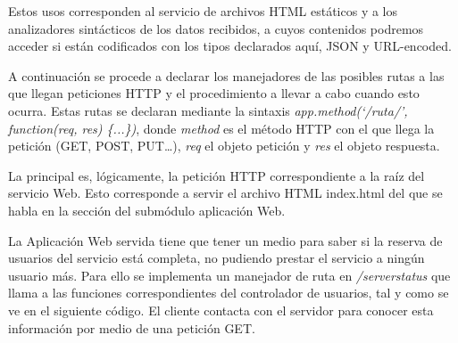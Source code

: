 
Estos usos corresponden al servicio de archivos HTML estáticos y a los analizadores sintácticos de los datos recibidos, a cuyos contenidos podremos acceder si están codificados con los tipos declarados aquí, JSON y URL-encoded.

A continuación se procede a declarar los manejadores de las posibles rutas a las que llegan peticiones HTTP y el procedimiento a llevar a cabo cuando esto ocurra. Estas rutas se declaran mediante la sintaxis \emph{app.method(`/ruta/', function(req, res) \{...\})}, donde \emph{method} es el método HTTP con el que llega la petición (GET, POST, PUT…), \emph{req} el objeto petición y \emph{res} el objeto respuesta.


La principal es, lógicamente, la petición HTTP correspondiente a la raíz del servicio Web. Esto corresponde a servir el archivo HTML index.html del que se habla en la sección del submódulo aplicación Web.

La Aplicación Web servida tiene que tener un medio para saber si la reserva de usuarios del servicio está completa, no pudiendo prestar el servicio a ningún usuario más. Para ello se implementa un manejador de ruta en \emph{/serverstatus} que llama a las funciones correspondientes del controlador de usuarios, tal y como se ve en el siguiente código. El cliente contacta con el servidor para conocer esta información por medio de una petición GET.


